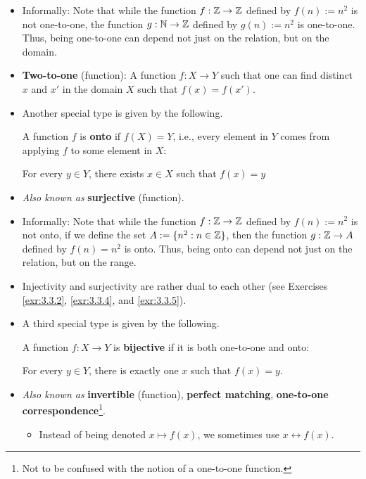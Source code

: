 \documentclass[../main.tex]{subfiles}
\begin{document}
\begin{itemize}
    \item Informally: Note that while the function $f:\mathbb{Z}\to\mathbb{Z}$ defined by $f(n):=n^2$ is not one-to-one, the function $g:\mathbb{N}\to\mathbb{Z}$ defined by $g(n):=n^2$ is one-to-one. Thus, being one-to-one can depend not just on the relation, but on the domain.
    \item \textbf{Two-to-one} (function): A function $f:X\to Y$ such that one can find distinct $x$ and $x'$ in the domain 
    $X$ such that $f(x)=f(x')$.
    \item Another special type is given by the following.
    \begin{dfn}\label{dfn:surjective}
        A function $f$ is \textbf{onto} if $f(X)=Y$, i.e., every element in $Y$ comes from applying $f$ to some element in $X$:
        \begin{center}
            For every $y\in Y$, there exists $x\in X$ such that $f(x)=y$
        \end{center}
    \end{dfn}
    \item \emph{Also known as} \textbf{surjective} (function).
    \item Informally: Note that while the function $f:\mathbb{Z}\to\mathbb{Z}$ defined by $f(n):=n^2$ is not onto, if we define the set $A:=\{n^2:n\in\mathbb{Z}\}$, then the function $g:\mathbb{Z}\to A$ defined by $f(n)=n^2$ is onto. Thus, being onto can depend not just on the relation, but on the range.
    \item Injectivity and surjectivity are rather dual to each other (see Exercises \ref{exr:3.3.2}, \ref{exr:3.3.4}, and \ref{exr:3.3.5}).
    \item {}A third special type is given by the following.
    \begin{dfn}\label{dfn:bijective}
        A function $f:X\to Y$ is \textbf{bijective} if it is both one-to-one and onto:
        \begin{center}
            For every $y\in Y$, there is exactly one $x$ such that $f(x)=y$.
        \end{center}
    \end{dfn}
    \pagebreak
    \item \emph{Also known as} \textbf{invertible} (function), \textbf{perfect matching}, \textbf{one-to-one correspondence}\footnote{Not to be confused with the notion of a one-to-one function.}.
    \begin{itemize}
        \item Instead of being denoted $x\mapsto f(x)$, we sometimes use $x\leftrightarrow f(x)$.

\end{itemize}
\end{itemize}
\end{document}
